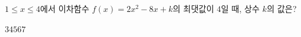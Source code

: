 $1\le x\le 4$에서 이차함수 $f(x)=2x^2-8x+k$의 최댓값이 $4$일 때, 상수 $k$의 값은?
\begin{choices32}{$3$}{$4$}{$5$}{$6$}{$7$}\end{choices32}
